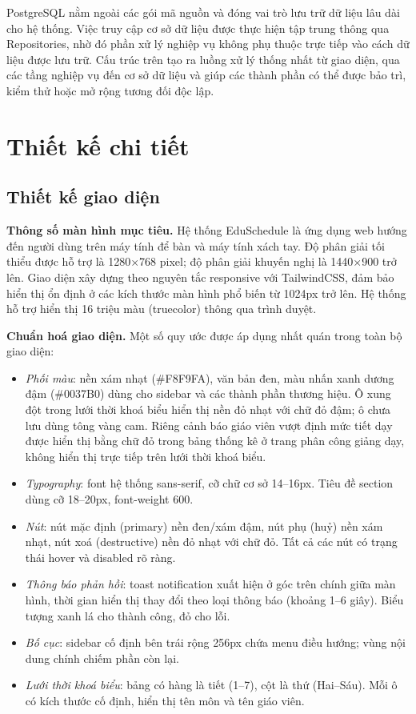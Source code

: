 \documentclass[../DoAn.tex]{subfiles}
\begin{document}
PostgreSQL nằm ngoài các gói mã nguồn và đóng vai trò lưu trữ dữ liệu lâu dài
cho hệ thống. Việc truy cập cơ sở dữ liệu được thực hiện tập trung thông qua
Repositories, nhờ đó phần xử lý nghiệp vụ không phụ thuộc trực tiếp vào cách
dữ liệu được lưu trữ. Cấu trúc trên tạo ra luồng xử lý thống nhất từ giao diện,
qua các tầng nghiệp vụ đến cơ sở dữ liệu và giúp các thành phần có thể được bảo
trì, kiểm thử hoặc mở rộng tương đối độc lập.


\section{Thiết kế chi tiết}
\subsection{Thiết kế giao diện}
\label{subsection:4.2.1}

\textbf{Thông số màn hình mục tiêu.} Hệ thống EduSchedule là ứng dụng web hướng đến người dùng trên máy tính để bàn và máy tính xách tay. Độ phân giải tối thiểu được hỗ trợ là 1280×768 pixel; độ phân giải khuyến nghị là 1440×900 trở lên. Giao diện xây dựng theo nguyên tắc responsive với TailwindCSS, đảm bảo hiển thị ổn định ở các kích thước màn hình phổ biến từ 1024px trở lên. Hệ thống hỗ trợ hiển thị 16 triệu màu (truecolor) thông qua trình duyệt.

\textbf{Chuẩn hoá giao diện.} Một số quy ước được áp dụng nhất quán trong toàn bộ giao diện:
\begin{itemize}[noitemsep]
    \item \textit{Phối màu}: nền xám nhạt (\#F8F9FA), văn bản đen, màu nhấn xanh dương đậm (\#0037B0) dùng cho sidebar và các thành phần thương hiệu. Ô xung đột trong lưới thời khoá biểu hiển thị nền đỏ nhạt với chữ đỏ đậm; ô chưa lưu dùng tông vàng cam. Riêng cảnh báo giáo viên vượt định mức tiết dạy được hiển thị bằng chữ đỏ trong bảng thống kê ở trang phân công giảng dạy, không hiển thị trực tiếp trên lưới thời khoá biểu.
    \item \textit{Typography}: font hệ thống sans-serif, cỡ chữ cơ sở 14–16px. Tiêu đề section dùng cỡ 18–20px, font-weight 600.
    \item \textit{Nút}: nút mặc định (primary) nền đen/xám đậm, nút phụ (huỷ) nền xám nhạt, nút xoá (destructive) nền đỏ nhạt với chữ đỏ. Tất cả các nút có trạng thái hover và disabled rõ ràng.
    \item \textit{Thông báo phản hồi}: toast notification xuất hiện ở góc trên chính giữa màn hình, thời gian hiển thị thay đổi theo loại thông báo (khoảng 1–6 giây). Biểu tượng xanh lá cho thành công, đỏ cho lỗi.
    \item \textit{Bố cục}: sidebar cố định bên trái rộng 256px chứa menu điều hướng; vùng nội dung chính chiếm phần còn lại.
    \item \textit{Lưới thời khoá biểu}: bảng có hàng là tiết (1–7), cột là thứ (Hai–Sáu). Mỗi ô có kích thước cố định, hiển thị tên môn và tên giáo viên.
\end{itemize}
\end{document}
